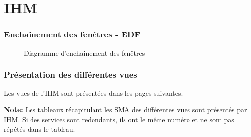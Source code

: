 \part{IHM}
\setcounter{section}{0}

\section{Enchainement des fenêtres - EDF}

\begin{figure}[H]
\noindent{}
\caption{Diagramme d'enchainement des fenêtres}
\end{figure}

\section{Présentation des différentes vues}
Les vues de l'IHM sont présentées dans les pages suivantes.

\begin{shaded}
\textbf{Note: } Les tableaux récapitulant les SMA des différentes vues sont présentés par IHM. Si des services sont redondants, ils ont le même numéro et ne sont pas répétés dans le tableau. 
\end{shaded}





